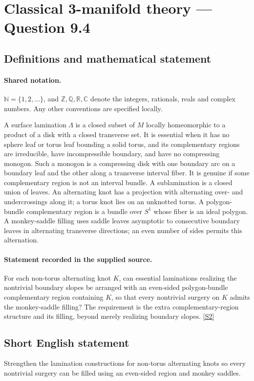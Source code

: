 \documentclass[11pt]{article}
\newcommand{\sref}[2]{\hyperlink{source:#1:#2}{[S#2]}}
\begin{document}
\section{Classical 3-manifold theory — Question 9.4}\label{statement}

\subsection{Definitions and mathematical statement}

\paragraph{Shared notation.}$\mathbb N=\{1,2,\ldots\}$, and $\mathbb Z,\mathbb Q,\mathbb R,\mathbb C$ denote the integers, rationals, reals and complex numbers. Any other conventions are specified locally.


A surface lamination $\Lambda$ is a closed subset of $M$ locally homeomorphic to a product of a disk with a closed transverse set. It is essential when it has no sphere leaf or torus leaf bounding a solid torus, and its complementary regions are irreducible, have incompressible boundary, and have no compressing monogon. Such a monogon is a compressing disk with one boundary arc on a boundary leaf and the other along a transverse interval fiber. It is genuine if some complementary region is not an interval bundle. A sublamination is a closed union of leaves. An alternating knot has a projection with alternating over- and undercrossings along it; a torus knot lies on an unknotted torus. A polygon-bundle complementary region is a bundle over $S^1$ whose fiber is an ideal polygon. A monkey-saddle filling uses saddle leaves asymptotic to consecutive boundary leaves in alternating transverse directions; an even number of sides permits this alternation.
\paragraph{Statement recorded in the supplied source.}
For each non-torus alternating knot $K$, can essential laminations realizing the nontrivial boundary slopes be arranged with an even-sided polygon-bundle complementary region containing $K$, so that every nontrivial surgery on $K$ admits the monkey-saddle filling? The requirement is the extra complementary-region structure and its filling, beyond merely realizing boundary slopes. \sref{statement}{2}
\subsection{Short English statement}
Strengthen the lamination constructions for non-torus alternating knots so every nontrivial surgery can be filled using an even-sided region and monkey saddles.
\end{document}
